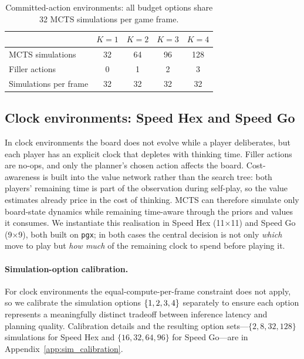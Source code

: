 \begin{table}[h]
  \centering
  \caption{Committed-action environments: all budget options share 32
    MCTS simulations per game frame.}
  \label{tab:budget}
  \small
  \begin{tabular}{lcccc}
    \toprule
    & $K{=}1$ & $K{=}2$ & $K{=}3$ & $K{=}4$ \\
    \midrule
    MCTS simulations       & 32 & 64 & 96 & 128 \\
    Filler actions         & 0  & 1  & 2  & 3   \\
    Simulations per frame  & 32 & 32 & 32 & 32  \\
    \bottomrule
  \end{tabular}
\end{table}

\subsection{Clock environments: Speed Hex and Speed Go}

In clock environments the board does not evolve while a player
deliberates, but each player has an explicit clock that depletes with
thinking time. Filler actions are no-ops, and only the planner's chosen
action affects the board. Cost-awareness is built into the value
network rather than the search tree: both players' remaining time is
part of the observation during self-play, so the value estimates already
price in the cost of thinking. MCTS can therefore simulate only
board-state dynamics while remaining time-aware through the priors and
values it consumes.
We instantiate this realisation in Speed Hex (11$\times$11) and Speed
Go (9$\times$9), both built on \texttt{pgx}; in both cases the central
decision is not only \emph{which} move to play but \emph{how much} of
the remaining clock to spend before playing it.

\paragraph{Simulation-option calibration.}
For clock environments the equal-compute-per-frame constraint does not
apply, so we calibrate the simulation options $\{1,2,3,4\}$ separately to
ensure each option represents a meaningfully distinct tradeoff between
inference latency and planning quality.
Calibration details and the resulting option sets---$\{2,8,32,128\}$
simulations for Speed Hex and $\{16,32,64,96\}$ for Speed Go---are in
Appendix~\ref{app:sim_calibration}.


